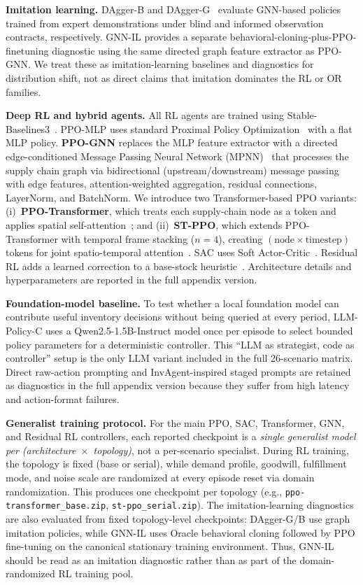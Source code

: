 \documentclass[10pt,a4paper]{article}
\begin{document}
\textbf{Imitation learning.}
DAgger-B and DAgger-G~\citep{ross2011} evaluate GNN-based policies
trained from expert demonstrations under blind and informed observation
contracts, respectively. GNN-IL provides a separate
behavioral-cloning-plus-PPO-finetuning diagnostic using the same
directed graph feature extractor as PPO-GNN. We treat these as
imitation-learning baselines and diagnostics for distribution shift,
not as direct claims that imitation dominates the RL or OR families.

\textbf{Deep RL and hybrid agents.}
All RL agents are trained using Stable-Baselines3~\citep{raffin2021}.
PPO-MLP uses standard Proximal Policy Optimization~\citep{schulman2017}
with a flat MLP policy.
\textbf{PPO-GNN} replaces the MLP feature extractor with a directed
edge-conditioned Message Passing Neural Network
(MPNN)~\citep{gilmer2017,velickovic2018} that processes
the supply chain graph via bidirectional (upstream/downstream)
message passing with edge features, attention-weighted aggregation,
residual connections, LayerNorm, and BatchNorm.
We introduce two Transformer-based PPO variants:
(i)~\textbf{PPO-Transformer}, which treats each supply-chain node as a token
and applies spatial self-attention~\citep{vaswani2017}; and
(ii)~\textbf{ST-PPO}, which extends PPO-Transformer with temporal frame
stacking ($n{=}4$), creating $(\text{node} \times \text{timestep})$ tokens
for joint spatio-temporal attention~\citep{parisotto2020}.
SAC uses Soft Actor-Critic~\citep{haarnoja2018}. Residual RL adds a learned
correction to a base-stock heuristic~\citep{silver2019}.
Architecture details and hyperparameters are reported in the full appendix
version.

\textbf{Foundation-model baseline.}
To test whether a local foundation model can contribute useful
inventory decisions without being queried at every period, LLM-Policy-C
uses a Qwen2.5-1.5B-Instruct model once per episode to select bounded
policy parameters for a deterministic controller. This ``LLM as
strategist, code as controller'' setup is the only LLM variant included
in the full 26-scenario matrix. Direct raw-action prompting and
InvAgent-inspired staged prompts are retained as diagnostics in the full
appendix version because they suffer from high latency and action-format
failures.

\textbf{Generalist training protocol.}
For the main PPO, SAC, Transformer, GNN, and Residual RL controllers,
each reported checkpoint is a \emph{single generalist model per
(architecture~$\times$~topology)}, not a per-scenario specialist.
During RL training, the topology is fixed (base or serial), while
demand profile, goodwill, fulfillment mode, and noise scale are
randomized at every episode reset via domain randomization. This
produces one checkpoint per topology (e.g.,
\texttt{ppo-transformer\_base.zip}, \texttt{st-ppo\_serial.zip}).
The imitation-learning diagnostics are also evaluated from fixed
topology-level checkpoints: DAgger-G/B use graph imitation policies,
while GNN-IL uses Oracle behavioral cloning followed by PPO fine-tuning
on the canonical stationary training environment. Thus, GNN-IL should be
read as an imitation diagnostic rather than as part of the
domain-randomized RL training pool.
\end{document}
